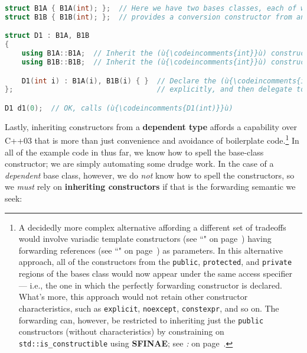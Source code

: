 \begin{lstlisting}[language=C++]
struct B1A { B1A(int); };  // Here we have two bases classes, each of which
struct B1B { B1B(int); };  // provides a conversion constructor from an (ù{\codeincomments{int}}ù).

struct D1 : B1A, B1B
{
    using B1A::B1A;  // Inherit the (ù{\codeincomments{int}}ù) constructor from base class (ù{\codeincomments{B1A}}ù).
    using B1B::B1B;  // Inherit the (ù{\codeincomments{int}}ù) constructor from base class (ù{\codeincomments{B1B}}ù).

    D1(int i) : B1A(i), B1B(i) { }  // Declare the (ù{\codeincomments{int}}ù) conversion constructor
};                                  // explicitly, and then delegate to bases.

D1 d1(0);  // OK, calls (ù{\codeincomments{D1(int)}}ù)
\end{lstlisting}

\noindent Lastly, inheriting constructors from a \textbf{dependent
type} affords a capability over C++03 that is more than just convenience
and avoidance of boilerplate code.{\cprotect\footnote{A decidedly more
complex alternative affording a different set of tradeoffs would
  involve variadic template constructors (see ``" on page~\pageref{variadictemplate}) having
 forwarding references (see ``" on page~\pageref{forwardingref}) as parameters. In this
  alternative approach, all of the constructors from the
  \mbox{\texttt{public}}, \mbox{\texttt{protected}}, and \mbox{\texttt{private}} regions of the
  bases class would now appear under the same access specifier --- i.e.,
  the one in which the perfectly forwarding constructor is declared.
  What's more, this approach would not retain other constructor
  characteristics, such as \texttt{explicit}, \texttt{noexcept},
  \texttt{constexpr}, and so on. The forwarding can, however, be restricted to
  inheriting just the \texttt{public} constructors (without
  characteristics) by constraining on \texttt{std::is\_constructible}
  using \textbf{SFINAE}; see \textit{: } on page~\pageref{access-levels-of-inherited-constructors-are-same-as-in-base-class}.}} In all of the example code in \textit{} thus far, we know how to spell the
base-class constructor; we are simply automating some drudge work. In
the case of a \emph{dependent} base class, however, we do \emph{not}
know how to spell the constructors, so we \emph{must} rely on
\textbf{inheriting constructors} if that is the forwarding semantic we
seek:

